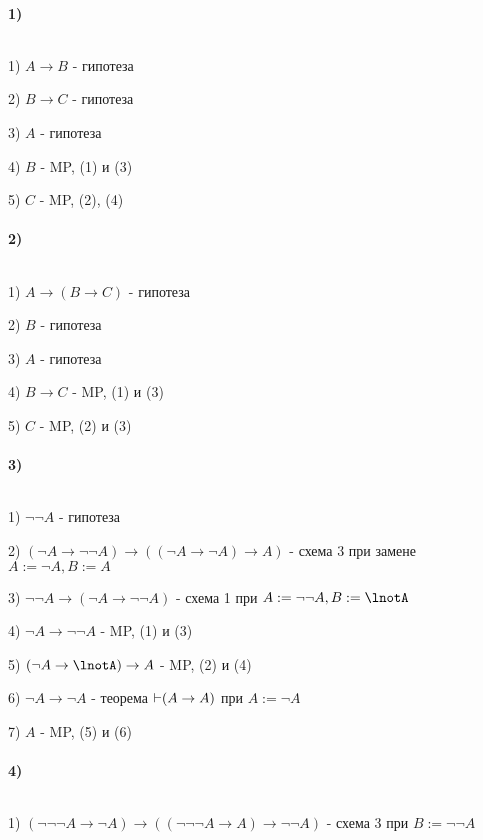 \begin{myproof}
${}$
\paragraph*{1)} ${}$ \newline
    

1) $A \to B$ - гипотеза

2) $B \to C$ - гипотеза

3) $A$ - гипотеза

4)  $B$ - MP, (1) и (3)

5)  $C$ - MP, (2), (4)


\paragraph*{2)} ${}$ \newline

1) $A \to (B \to C)$ - гипотеза

2) $B$ - гипотеза

3) $A$ - гипотеза

4) $B \to C$ - MP, (1) и (3)

5) $C$ - MP, (2) и (3)

\paragraph*{3)} ${}$ \newline

1) $\lnot\lnot A$ - гипотеза

2)  $(\lnot A \to \lnot\lnot A)\to ((\lnot A \to \lnot A) \to A)$ - схема 3 при замене $A:=\lnot A,
B := A$

3)  $\lnot\lnot A \to (\lnot A \to \lnot\lnot A)$ - схема 1 при $A:=\lnot\lnot A, B:=\lnotA$

4)  $\lnot A \to \lnot\lnot A$ - MP, (1) и (3)

5) $(\lnot A \to \lnotA) \to A$ - MP, (2) и (4)

6) $\lnot A \to \lnot A$ - теорема $\operatorname{\vdash} (A \to A)$ при $A :=\lnot A$ 

7) $A$ - MP, (5) и (6)

\paragraph*{4)} ${}$ \newline

1) $(\lnot\lnot\lnot A \to \lnot A) \to ((\lnot\lnot\lnot A \to A) \to \lnot\lnot A)$ -
схема 3 при $B := \lnot\lnot A$


\end{myproof}
